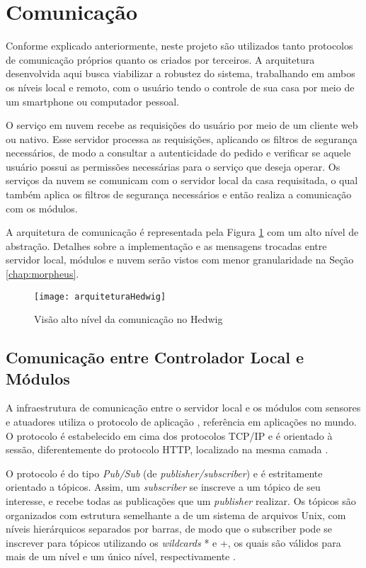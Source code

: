 \section{Comunicação}

Conforme explicado anteriormente, neste projeto são utilizados tanto protocolos de comunicação próprios quanto os criados por terceiros. A arquitetura desenvolvida aqui busca viabilizar a robustez do sistema, trabalhando em ambos os níveis local e remoto, com o usuário tendo o controle de sua casa por meio de um smartphone ou computador pessoal.

O serviço em nuvem recebe as requisições do usuário por meio de um cliente web ou nativo. Esse servidor processa as requisições, aplicando os filtros de segurança necessários, de modo a consultar a autenticidade do pedido e verificar se aquele usuário possui as permissões necessárias para o serviço que deseja operar. Os serviços da nuvem se comunicam com o servidor local da casa requisitada, o qual também aplica os filtros de segurança necessários e então realiza a comunicação com os módulos.

A arquitetura de comunicação é representada pela Figura \ref{fig:diagramaComunicacao} com um alto nível de abstração. Detalhes sobre a implementação e as mensagens trocadas entre servidor local, módulos e nuvem serão vistos com menor granularidade na Seção \ref{chap:morpheus}.

\begin{figure}[H]
	\centering
	\caption{Visão alto nível da comunicação no Hedwig}
	\texttt{[image: arquiteturaHedwig]}
	\label{fig:diagramaComunicacao}
\end{figure}

\subsection{Comunicação entre Controlador Local e Módulos}

A infraestrutura de comunicação entre o servidor local e os módulos com sensores e atuadores utiliza o protocolo de aplicação \wmqtt{}, referência em aplicações \wiot{} no mundo. O protocolo \wmqtt{} é estabelecido em cima dos protocolos TCP/IP e é orientado à sessão, diferentemente do protocolo HTTP, localizado na mesma camada \cite{ibmMqtt}.

O protocolo \wmqtt{} é do tipo \emph{Pub/Sub} (de \textit{publisher/subscriber}) e é estritamente orientado a tópicos. Assim, um \textit{subscriber} se inscreve a um tópico de seu interesse, e recebe todas as publicações que um \textit{publisher} realizar. Os tópicos são organizados com estrutura semelhante a de um sistema de arquivos Unix, com níveis hierárquicos separados por barras, de modo que o subscriber pode se inscrever para tópicos utilizando os \textit{wildcards} * e +, os quais são válidos para mais de um nível e um único nível, respectivamente \cite{mqttDocumentation}.

